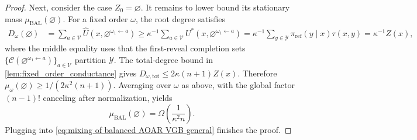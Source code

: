 \documentclass{article}
\numberwithin{theorem}{section}
\numberwithin{proposition}{section}
\numberwithin{corollary}{section}
\numberwithin{lemma}{section}
\numberwithin{conjecture}{section}
\numberwithin{remark}{section}
\numberwithin{definition}{section}
\numberwithin{assumption}{section}
\numberwithin{example}{section}
\newcommand{\calC}{{\mathcal{C}}}
\newcommand{\calV}{{\mathcal{V}}}
\newcommand{\calY}{{\mathcal{Y}}}
\newcommand{\sbra}[1]{\left(#1\right)}
\providecommand{\base}{\pi_{\mathrm{ref}}}
\begin{document}
\begin{proof}
Next, consider the case $Z_0 = \varnothing.$ 
It remains to lower bound its stationary mass $\mu_{\mathrm{BAL}}(\varnothing)$. For a fixed order $\omega$, the root degree satisfies
\begin{align*}
    D_\omega(\varnothing)
    &=\sum_{a\in\calV}\widehat U(x,\varnothing^{\omega_1\leftarrow a})
    \ge \kappa^{-1}\sum_{a\in\calV}U^*(x,\varnothing^{\omega_1\leftarrow a}) =\kappa^{-1}\sum_{y\in\calY}\base(y\mid x)\tau(x,y)
    =\kappa^{-1}Z(x),
\end{align*}
where the middle equality uses that the first-reveal completion sets
$\{\calC(\varnothing^{\omega_1\leftarrow a})\}_{a\in\calV}$ partition $\calY$.
The total-degree bound in \cref{lem:fixed_order_conductance} gives $D_{\omega,\mathrm{tot}}\le 2\kappa(n+1)Z(x)$. Therefore $\mu_\omega(\varnothing)\ge 1/(2\kappa^2(n+1))$. Averaging over $\omega$ as above, with the global factor $(n-1)!$ canceling after normalization, yields
\begin{equation*}
    \mu_{\mathrm{BAL}}(\varnothing) = \Omega\sbra{\frac{1}{\kappa^2 n}}.
\end{equation*}
Plugging into \eqref{eq:mixing of balanced AOAR VGB general} finishes the proof.

\end{proof}
\end{document}
